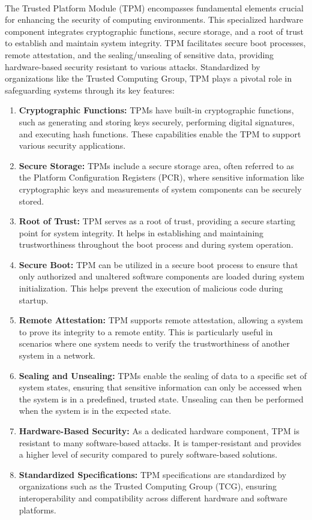 \paragraph*{}
The Trusted Platform Module (TPM) encompasses fundamental elements crucial for enhancing the security of computing environments. This specialized hardware component integrates cryptographic functions, secure storage, and a root of trust to establish and maintain system integrity. TPM facilitates secure boot processes, remote attestation, and the sealing/unsealing of sensitive data, providing hardware-based security resistant to various attacks. Standardized by organizations like the Trusted Computing Group, TPM plays a pivotal role in safeguarding systems through its key features:
\begin{enumerate}
	\item \textbf{Cryptographic Functions:} TPMs have built-in cryptographic functions, such as generating and storing keys securely, performing digital signatures, and executing hash functions. These capabilities enable the TPM to support various security applications.
	\item \textbf{Secure Storage:} TPMs include a secure storage area, often referred to as the Platform Configuration Registers (PCR), where sensitive information like cryptographic keys and measurements of system components can be securely stored.
	\item \textbf{Root of Trust:} TPM serves as a root of trust, providing a secure starting point for system integrity. It helps in establishing and maintaining trustworthiness throughout the boot process and during system operation.
	\item \textbf{Secure Boot:} TPM can be utilized in a secure boot process to ensure that only authorized and unaltered software components are loaded during system initialization. This helps prevent the execution of malicious code during startup.
	\item \textbf{Remote Attestation:} TPM supports remote attestation, allowing a system to prove its integrity to a remote entity. This is particularly useful in scenarios where one system needs to verify the trustworthiness of another system in a network.
	\item \textbf{Sealing and Unsealing:} TPMs enable the sealing of data to a specific set of system states, ensuring that sensitive information can only be accessed when the system is in a predefined, trusted state. Unsealing can then be performed when the system is in the expected state.
	\item \textbf{Hardware-Based Security:} As a dedicated hardware component, TPM is resistant to many software-based attacks. It is tamper-resistant and provides a higher level of security compared to purely software-based solutions.
	\item \textbf{Standardized Specifications:} TPM specifications are standardized by organizations such as the Trusted Computing Group (TCG), ensuring interoperability and compatibility across different hardware and software platforms.
\end{enumerate}
